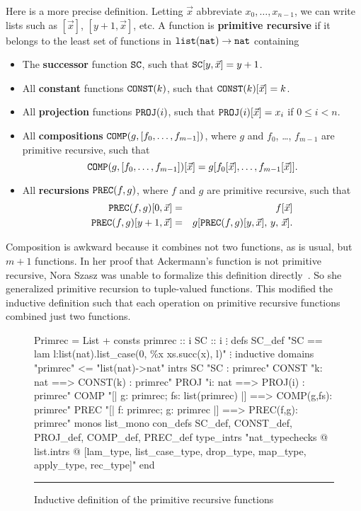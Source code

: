 \documentclass[12pt]{article}
\newcommand\defn[1]{{\bf#1}}
\newcommand\nat{\hbox{\tt nat}}
\newcommand\lst{\hbox{\tt list}}
\newcommand\SC{\hbox{\tt SC}}
\newcommand\CONST{\hbox{\tt CONST}}
\newcommand\PROJ{\hbox{\tt PROJ}}
\newcommand\COMP{\hbox{\tt COMP}}
\newcommand\PREC{\hbox{\tt PREC}}
\begin{document}
Here is a more precise definition.  Letting $\vec{x}$ abbreviate
$x_0,\ldots,x_{n-1}$, we can write lists such as $[\vec{x}]$,
$[y+1,\vec{x}]$, etc.  A function is \defn{primitive recursive} if it
belongs to the least set of functions in $\lst(\nat)\to\nat$ containing
\begin{itemize}
\item The \defn{successor} function $\SC$, such that $\SC[y,\vec{x}]=y+1$.
\item All \defn{constant} functions $\CONST(k)$, such that
  $\CONST(k)[\vec{x}]=k$. 
\item All \defn{projection} functions $\PROJ(i)$, such that
  $\PROJ(i)[\vec{x}]=x_i$ if $0\leq i<n$. 
\item All \defn{compositions} $\COMP(g,[f_0,\ldots,f_{m-1}])$, 
where $g$ and $f_0$, \ldots, $f_{m-1}$ are primitive recursive,
such that
\[ \COMP(g,[f_0,\ldots,f_{m-1}])[\vec{x}] = 
   g[f_0[\vec{x}],\ldots,f_{m-1}[\vec{x}]]. \] 

\item All \defn{recursions} $\PREC(f,g)$, where $f$ and $g$ are primitive
  recursive, such that
\begin{eqnarray*}
  \PREC(f,g)[0,\vec{x}] & = & f[\vec{x}] \\
  \PREC(f,g)[y+1,\vec{x}] & = & g[\PREC(f,g)[y,\vec{x}],\, y,\, \vec{x}].
\end{eqnarray*} 
\end{itemize}
Composition is awkward because it combines not two functions, as is usual,
but $m+1$ functions.  In her proof that Ackermann's function is not
primitive recursive, Nora Szasz was unable to formalize this definition
directly~\cite{szasz93}.  So she generalized primitive recursion to
tuple-valued functions.  This modified the inductive definition such that
each operation on primitive recursive functions combined just two functions.

\begin{figure}
\begin{ttbox}
Primrec = List +
consts
  primrec :: i
  SC      :: i
  \(\vdots\)
defs
  SC_def    "SC == lam l:list(nat).list_case(0, \%x xs.succ(x), l)"
  \(\vdots\)
inductive
  domains "primrec" <= "list(nat)->nat"
  intrs
    SC       "SC : primrec"
    CONST    "k: nat ==> CONST(k) : primrec"
    PROJ     "i: nat ==> PROJ(i) : primrec"
    COMP     "[| g: primrec; fs: list(primrec) |] ==> COMP(g,fs): primrec"
    PREC     "[| f: primrec; g: primrec |] ==> PREC(f,g): primrec"
  monos       list_mono
  con_defs    SC_def, CONST_def, PROJ_def, COMP_def, PREC_def
  type_intrs "nat_typechecks @ list.intrs @                      
              [lam_type, list_case_type, drop_type, map_type,    
               apply_type, rec_type]"
end
\end{ttbox}
\hrule
\caption{Inductive definition of the primitive recursive functions} 
\label{primrec-fig}
\end{figure}
\def\fs{{\it fs}} 
\end{document}
